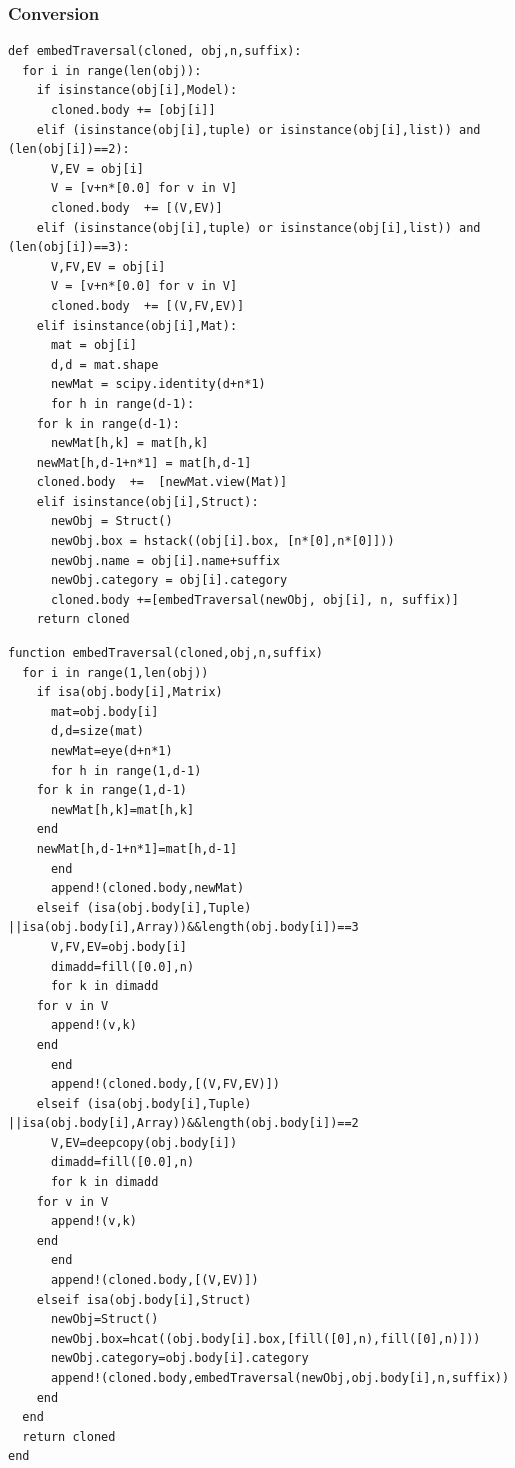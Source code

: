 \documentclass[a4paper,12pt]{article}
\begin{document}
\subsubsection{Conversion}
\begin{Verbatim}[fontsize=\footnotesize]
def embedTraversal(cloned, obj,n,suffix):
  for i in range(len(obj)):
    if isinstance(obj[i],Model):
      cloned.body += [obj[i]]
    elif (isinstance(obj[i],tuple) or isinstance(obj[i],list)) and (len(obj[i])==2):
      V,EV = obj[i]
      V = [v+n*[0.0] for v in V]
      cloned.body  += [(V,EV)]
    elif (isinstance(obj[i],tuple) or isinstance(obj[i],list)) and (len(obj[i])==3):
      V,FV,EV = obj[i]
      V = [v+n*[0.0] for v in V]
      cloned.body  += [(V,FV,EV)]
    elif isinstance(obj[i],Mat):
      mat = obj[i]
      d,d = mat.shape
      newMat = scipy.identity(d+n*1)
      for h in range(d-1):
	for k in range(d-1):
	  newMat[h,k] = mat[h,k]
	newMat[h,d-1+n*1] = mat[h,d-1]
	cloned.body  +=  [newMat.view(Mat)]
    elif isinstance(obj[i],Struct):
      newObj = Struct()
      newObj.box = hstack((obj[i].box, [n*[0],n*[0]]))
      newObj.name = obj[i].name+suffix
      newObj.category = obj[i].category
      cloned.body +=[embedTraversal(newObj, obj[i], n, suffix)]
    return cloned
\end{Verbatim}
\begin{Verbatim}[fontsize=\footnotesize]
function embedTraversal(cloned,obj,n,suffix)
  for i in range(1,len(obj))
    if isa(obj.body[i],Matrix)
      mat=obj.body[i]
      d,d=size(mat)
      newMat=eye(d+n*1)
      for h in range(1,d-1)
	for k in range(1,d-1)
	  newMat[h,k]=mat[h,k]
	end
	newMat[h,d-1+n*1]=mat[h,d-1]
      end
      append!(cloned.body,newMat)
    elseif (isa(obj.body[i],Tuple) ||isa(obj.body[i],Array))&&length(obj.body[i])==3 
      V,FV,EV=obj.body[i]
      dimadd=fill([0.0],n)
      for k in dimadd
	for v in V
	  append!(v,k)
	end
      end
      append!(cloned.body,[(V,FV,EV)])
    elseif (isa(obj.body[i],Tuple) ||isa(obj.body[i],Array))&&length(obj.body[i])==2
      V,EV=deepcopy(obj.body[i])
      dimadd=fill([0.0],n)
      for k in dimadd
	for v in V
	  append!(v,k)
	end
      end
      append!(cloned.body,[(V,EV)])
    elseif isa(obj.body[i],Struct)
      newObj=Struct()
      newObj.box=hcat((obj.body[i].box,[fill([0],n),fill([0],n)]))
      newObj.category=obj.body[i].category
      append!(cloned.body,embedTraversal(newObj,obj.body[i],n,suffix))
    end
  end
  return cloned
end
\end{Verbatim}
\end{document}
